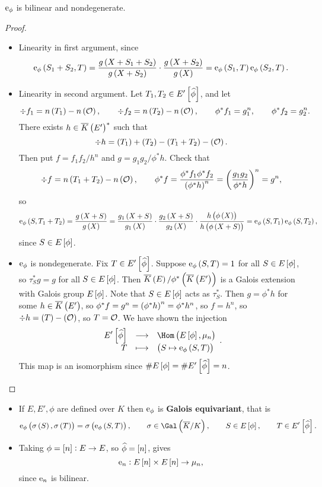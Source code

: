\begin{proposition}
$ \mathrm{e}_\phi $ is bilinear and nondegenerate.
\end{proposition}

\begin{proof}
\hfill
\begin{itemize}
\item Linearity in first argument, since
$$ \e_\phi\br{S_1 + S_2, T} = \dfrac{g\br{X + S_1 + S_2}}{g\br{X + S_2}} \cdot \dfrac{g\br{X + S_2}}{g\br{X}} = \e_\phi\br{S_1, T}\e_\phi\br{S_2, T}. $$

\pagebreak

\item Linearity in second argument. Let $ T_1, T_2 \in E'\sbr{\widehat{\phi}} $, and let
$$ \div f_1 = n\br{T_1} - n\br{\OOO}, \qquad \div f_2 = n\br{T_2} - n\br{\OOO}, \qquad \phi^*f_1 = g_1^n, \qquad \phi^*f_2 = g_2^n. $$
There exists $ h \in \overline{K}\br{E'}^* $ such that
$$ \div h = \br{T_1} + \br{T_2} - \br{T_1 + T_2} - \br{\OOO}. $$
Then put $ f = f_1f_2 / h^n $ and $ g = g_1g_2 / \phi^*h $. Check that
$$ \div f = n\br{T_1 + T_2} - n\br{\OOO}, \qquad \phi^*f = \dfrac{\phi^*f_1\phi^*f_2}{\br{\phi^*h}^n} = \br{\dfrac{g_1g_2}{\phi^*h}}^n = g^n, $$
so
$$ \e_\phi\br{S, T_1 + T_2} = \dfrac{g\br{X + S}}{g\br{X}} = \dfrac{g_1\br{X + S}}{g_1\br{X}} \cdot \dfrac{g_2\br{X + S}}{g_2\br{X}} \cdot \dfrac{h\br{\phi\br{X}}}{h\br{\phi\br{X + S}}} = \e_\phi\br{S, T_1}\e_\phi\br{S, T_2}, $$
since $ S \in E\sbr{\phi} $.
\item $ \mathrm{e}_\phi $ is nondegenerate. Fix $ T \in E'\sbr{\widehat{\phi}} $. Suppose $ \e_\phi\br{S, T} = 1 $ for all $ S \in E\sbr{\phi} $, so $ \tau_S^*g = g $ for all $ S \in E\sbr{\phi} $. Then $ \overline{K}\br{E} / \phi^*\br{\overline{K}\br{E'}} $ is a Galois extension with Galois group $ E\sbr{\phi} $. Note that $ S \in E\sbr{\phi} $ acts as $ \tau_S^* $. Then $ g = \phi^*h $ for some $ h \in \overline{K}\br{E'} $, so $ \phi^*f = g^n = \br{\phi^*h}^n = \phi^*h^n $, so $ f = h^n $, so $ \div h = \br{T} - \br{\OOO} $, so $ T = \mathcal{O} $. We have shown the injection
$$ \function{E'\sbr{\widehat{\phi}}}{\Hom\br{E\sbr{\phi}, \mu_n}}{T}{\br{S \mapsto \e_\phi\br{S, T}}}. $$
This map is an isomorphism since $ \#E\sbr{\phi} = \#E'\sbr{\widehat{\phi}} = n $.
\end{itemize}
\end{proof}

\begin{remark*}
\hfill
\begin{itemize}
\item If $ E, E', \phi $ are defined over $ K $ then $ \mathrm{e}_\phi $ is \textbf{Galois equivariant}, that is
$$ \e_\phi\br{\sigma\br{S}, \sigma\br{T}} = \sigma\br{\e_\phi\br{S, T}}, \qquad \sigma \in \Gal\br{\overline{K} / K}, \qquad S \in E\sbr{\phi}, \qquad T \in E'\sbr{\widehat{\phi}}. $$
\item Taking $ \phi = \sbr{n} : E \to E $, so $ \widehat{\phi} = \sbr{n} $, gives
$$ \e_n : E\sbr{n} \times E\sbr{n} \to \mu_n, $$
since $ \mathrm{e}_n $ is bilinear.
\end{itemize}
\end{remark*}

